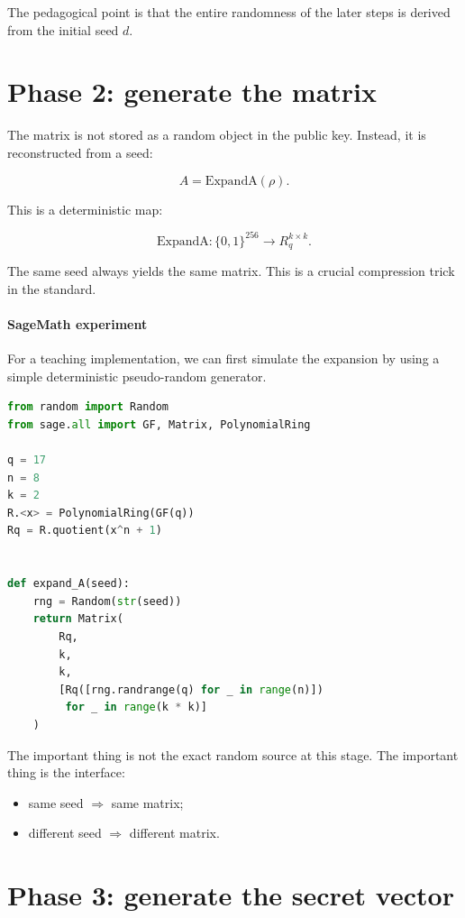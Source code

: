 The pedagogical point is that the entire randomness of the later steps is derived from the initial seed $d$.

\section{Phase 2: generate the matrix}

The matrix is not stored as a random object in the public key. Instead, it is reconstructed from a seed:

\[
A = \mathrm{ExpandA}(\rho).
\]

This is a deterministic map:

\[
\mathrm{ExpandA}: \{0,1\}^{256} \to R_q^{k\times k}.
\]

The same seed always yields the same matrix. This is a crucial compression trick in the standard.

\paragraph{SageMath experiment}

For a teaching implementation, we can first simulate the expansion by using a simple deterministic pseudo-random generator.

\begin{lstlisting}[language=Python]
from random import Random
from sage.all import GF, Matrix, PolynomialRing

q = 17
n = 8
k = 2
R.<x> = PolynomialRing(GF(q))
Rq = R.quotient(x^n + 1)


def expand_A(seed):
    rng = Random(str(seed))
    return Matrix(
        Rq,
        k,
        k,
        [Rq([rng.randrange(q) for _ in range(n)])
         for _ in range(k * k)]
    )
\end{lstlisting}

The important thing is not the exact random source at this stage. The important thing is the interface:

\begin{itemize}
  \item same seed $\Rightarrow$ same matrix;
  \item different seed $\Rightarrow$ different matrix.
\end{itemize}

\section{Phase 3: generate the secret vector}

